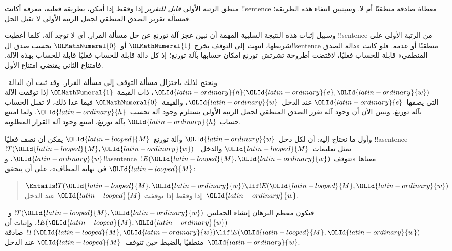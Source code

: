 \documentclass[../../../include/open-logic-section]{subfiles}
\begin{document}

منطق الرتبة الأولى \emph{قابل للتقرير} إذا وفقط إذا أمكن، بطريقة
فعلية، معرفة أكانت !!{sentence} معطاة صادقة منطقيًا أم لا.
وسيتبين انتفاء هذه الطريقة؛ فمسألة تقرير الصدق المنطقي لجمل
الرتبة الأولى لا تقبل الحل.

وسبيل إثبات هذه النتيجة السلبية المهمة أن نبين عجز آلة تورنغ عن
حل مسألة القرار. أي لا توجد آلة، كلما أعطيت !!{sentence} من الرتبة
الأولى على شريطها، انتهت إلى التوقف بخرج ${\OLMathNumeral{1}}$ أو~${\OLMathNumeral{0}}$ بحسب صدق
ال!!{sentence} منطقيًا أو عدمه. فلو كانت «دالة الصدق المنطقي»
قابلة للحساب فعليًا، لاقتضت أطروحة تشرتش--تورنغ إمكان حسابها بآلة
تورنغ؛ إذ كل دالة قابلة للحساب فعليًا قابلة للحساب بهذه الآلة.
فامتناع الثاني يقتضي امتناع الأول.

ونحتج لذلك باختزال مسألة التوقف إلى مسألة القرار. وقد ثبت أن
الدالة~${\OLId{latin-ordinary}{h}}({\OLId{latin-ordinary}{e}},{\OLId{latin-ordinary}{w}})$، ذات القيمة~${\OLMathNumeral{1}}$ إذا توقفت الآلة التي يصفها~${\OLId{latin-ordinary}{e}}$
عند الدخل~${\OLId{latin-ordinary}{w}}$، والقيمة~${\OLMathNumeral{0}}$ فيما عدا ذلك، لا تقبل الحساب بآلة
تورنغ. ونبين الآن أن وجود آلة تقرر الصدق المنطقي لجمل الرتبة
الأولى يستلزم وجود آلة تحسب~${\OLId{latin-ordinary}{h}}$. ولما امتنع حساب ${\OLId{latin-ordinary}{h}}$ بآلة
تورنغ، امتنع وجود آلة القرار المطلوبة.

وأول ما نحتاج إليه: أن لكل دخل~${\OLId{latin-ordinary}{w}}$ وآلة تورنغ~${\OLId{latin-looped}{M}}$ يمكن أن
نصف فعليًا !!a{sentence}~$!T({\OLId{latin-looped}{M}},{\OLId{latin-ordinary}{w}})$ تمثل تعليمات~${\OLId{latin-looped}{M}}$
والدخل~${\OLId{latin-ordinary}{w}}$، و!!a{sentence}~$!E({\OLId{latin-looped}{M}},{\OLId{latin-ordinary}{w}})$ معناها «تتوقف ${\OLId{latin-looped}{M}}$
في نهاية المطاف»، على أن يتحقق:
\begin{quote}
  $\Entails !T({\OLId{latin-looped}{M}},{\OLId{latin-ordinary}{w}}) \lif !E({\OLId{latin-looped}{M}},{\OLId{latin-ordinary}{w}})$ إذا وفقط إذا توقفت ${\OLId{latin-looped}{M}}$ عند الدخل~${\OLId{latin-ordinary}{w}}$.
\end{quote}
فيكون معظم البرهان إنشاء الجملتين $!T({\OLId{latin-looped}{M}},{\OLId{latin-ordinary}{w}})$ و~$!E({\OLId{latin-looped}{M}},{\OLId{latin-ordinary}{w}})$،
وإثبات أن $!T({\OLId{latin-looped}{M}},{\OLId{latin-ordinary}{w}})\lif !E({\OLId{latin-looped}{M}},{\OLId{latin-ordinary}{w}})$ صادقة منطقيًا بالضبط حين
تتوقف~${\OLId{latin-looped}{M}}$ عند الدخل~${\OLId{latin-ordinary}{w}}$.
\end{document}
